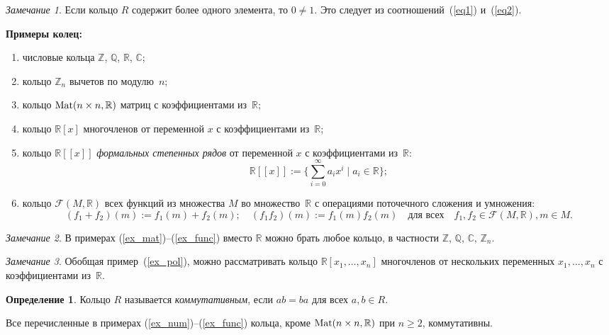 \documentclass[a4paper,10pt]{amsart}
\def\Mat{{\rm Mat}}%
\def\CC{{\mathbb C}}%
\def\ZZ{{\mathbb Z}}%
\def\RR{{\mathbb R}}%
\def\QQ{{\mathbb Q}}%
\def\FFF{\mathcal{F}}
\def\Mat{{\rm Mat}}
\theoremstyle{definition}
\newtheorem{definition}{Определение}
\theoremstyle{remark}
\newtheorem{remark}{Замечание}
\begin{document}
\begin{remark}
Если кольцо $R$ содержит более одного элемента, то $0\ne 1$. Это
следует из соотношений~(\ref{eq1}) и~(\ref{eq2}).
\end{remark}

\textbf{Примеры колец:}
\begin{enumerate}[label=\textup{(\arabic*)},ref=\textup{\arabic*}]
\item \label{ex_num}
числовые кольца $\ZZ$, $\QQ$, $\RR$, $\CC$;

\item
кольцо $\ZZ_n$ вычетов по модулю~$n$;

\item \label{ex_mat}
кольцо $\Mat(n\times n, \RR)$ матриц с коэффициентами из~$\RR$;

\item \label{ex_pol}
кольцо $\RR[x]$ многочленов от переменной $x$ с коэффициентами
из~$\RR$;

\item
кольцо $\RR[[x]]$ \textit{формальных степенных рядов} от переменной
$x$ с коэффициентами из~$\RR$:
$$
\RR[[x]] := \lbrace \sum \limits_{i = 0}^\infty a_i x^i \mid a_i \in
\RR \rbrace;
$$

\item \label{ex_func}
кольцо $\FFF(M, \RR)$ всех функций из множества $M$ во
множество~$\RR$ с операциями поточечного сложения и умножения:
$$
(f_1 + f_2)(m) := f_1(m) + f_2(m); \quad (f_1f_2)(m) := f_1(m)
f_2(m) \quad \text{для всех} \quad f_1,f_2 \in \FFF(M, \RR), m \in
M.
$$
\end{enumerate}

\begin{remark}
В примерах (\ref{ex_mat})--(\ref{ex_func}) вместо $\RR$ можно брать
любое кольцо, в частности $\ZZ$, $\QQ$, $\CC$, $\ZZ_n$.
\end{remark}

\begin{remark}
Обобщая пример~(\ref{ex_pol}), можно рассматривать кольцо $\RR[x_1,
\ldots, x_n]$ многочленов от нескольких переменных $x_1, \ldots,
x_n$ с коэффициентами из~$\RR$.
\end{remark}

\begin{definition}
Кольцо $R$ называется {\it коммутативным}, если $ab=ba$ для всех
$a,b\in R$.
\end{definition}

Все перечисленные в примерах (\ref{ex_num})--(\ref{ex_func}) кольца,
кроме $\Mat(n\times n, \RR)$ при $n \geqslant 2$, коммутативны.
\end{document}
